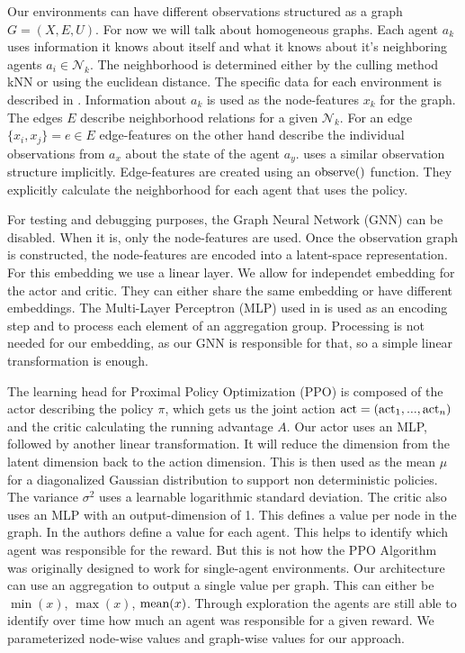 Our environments can have different observations structured as a graph $G = (X,E,U)$. For now we will talk about homogeneous graphs. Each agent $a_k$ uses information it knows about itself and what it knows about it's neighboring agents $a_i \in \mathcal{N}_k$. The neighborhood is determined either by the culling method kNN or using the euclidean distance. The specific data for each environment is described in . Information about $a_k$ is used as the node-features $x_k$ for the graph. The edges $E$ describe neighborhood relations for a given $\mathcal{N}_k$. For an edge $\{x_i,x_j\} = e \in E$ edge-features on the other hand describe the individual observations from $a_x$ about the state of the agent $a_y$.  uses a similar observation structure implicitly. Edge-features are created using an $\textup{observe()}$ function. They explicitly calculate the neighborhood for each agent that uses the policy. \par

For testing and debugging purposes, the Graph Neural Network (GNN) can be disabled. When it is, only the node-features are used. Once the observation graph is constructed, the node-features are encoded into a latent-space representation. For this embedding we use a linear layer. We allow for independet embedding for the actor and critic. They can either share the same embedding or have different embeddings. The Multi-Layer Perceptron (MLP) used in  is used as an encoding step and to process each element of an aggregation group. Processing is not needed for our embedding, as our GNN is responsible for that, so a simple linear transformation is enough.\par

The learning head for Proximal Policy Optimization (PPO) is composed of the actor describing the policy $\pi$, which gets us the joint action $\textup{act} = (\textup{act}_1,...,\textup{act}_n)$ and the critic calculating the running advantage $A$. Our actor uses an MLP, followed by another linear transformation. It will reduce the dimension from the latent dimension back to the action dimension. This is then used as the mean $\mu$ for a diagonalized Gaussian distribution to support non deterministic policies. The variance $\sigma^2$ uses a learnable logarithmic standard deviation. The critic also uses an MLP with an output-dimension of 1. This defines a value per node in the graph. In  the authors define a value for each agent. This helps to identify which agent was responsible for the reward. But this is not how the PPO Algorithm was originally designed to work for single-agent environments. Our architecture can use an aggregation to output a single value per graph. This can either be $\min(x)$, $\max(x)$, $\textup{mean}(x)$. Through exploration the agents are still able to identify over time how much an agent was responsible for a given reward. We parameterized node-wise values and graph-wise values for our approach. \par



